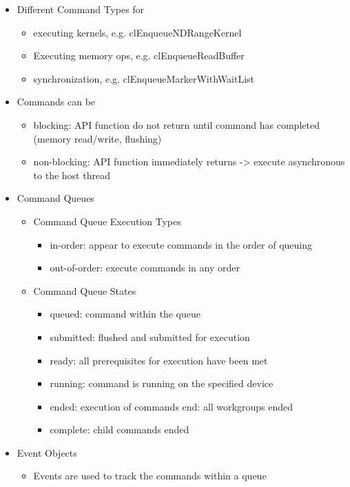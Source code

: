 \documentclass[paper=a4, fontsize=11pt]{scrartcl} %
\numberwithin{equation}{section} %
\numberwithin{figure}{section} %
\numberwithin{table}{section} %
\begin{document}
\begin{itemize}
  \item Different Command Types for
  \begin{itemize}
    \item executing kernels, e.g. clEnqueueNDRangeKernel
    \item Executing memory ops, e.g. clEnqueueReadBuffer
    \item synchronization, e.g. clEnqueueMarkerWithWaitList
  \end{itemize}
  \item Commands can be
  \begin{itemize}
    \item blocking: API function do not return until command has completed (memory read/write, flushing)
    \item non-blocking: API function immediately returns -> execute asynchronous to the host thread
  \end{itemize}
  \item Command Queues
  \begin{itemize}
    \item Command Queue Execution Types
    \begin{itemize}
      \item in-order: appear to execute commands in the order of queuing
      \item out-of-order: execute commands in any order
    \end{itemize}
    \item Command Queue States
    \begin{itemize}
      \item queued: command within the queue
      \item submitted: flushed and submitted for execution
      \item ready: all prerequisites for execution have been met
      \item running: command is running on the specified device
      \item ended: execution of commands end: all workgroups ended
      \item complete: child commands ended
    \end{itemize}
  \end{itemize}
  \item Event Objects
  \begin{itemize}
    \item Events are used to track the commands within a queue
    \begin{itemize}

\end{itemize}
\end{itemize}
\end{itemize}
\end{document}

